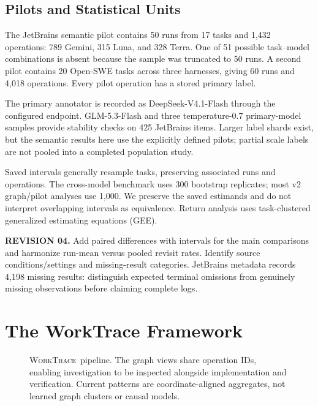 \documentclass[10pt,a4paper,twocolumn]{article}
\newcommand{\rev}[2]{\par\smallskip\noindent\begin{minipage}{\linewidth}\color{revision}\footnotesize\textbf{REVISION #1.} #2\end{minipage}\par\smallskip}
\newcommand{\wt}{\textsc{WorkTrace}}
\begin{document}
\subsection{Pilots and Statistical Units}
The JetBrains semantic pilot contains 50 runs from 17 tasks and 1,432 operations: 789 Gemini, 315 Luna, and 328 Terra. One of 51 possible task--model combinations is absent because the sample was truncated to 50 runs. A second pilot contains 20 Open-SWE tasks across three harnesses, giving 60 runs and 4,018 operations. Every pilot operation has a stored primary label.

The primary annotator is recorded as DeepSeek-V4.1-Flash through the configured endpoint. GLM-5.3-Flash and three temperature-0.7 primary-model samples provide stability checks on 425 JetBrains items. Larger label shards exist, but the semantic results here use the explicitly defined pilots; partial scale labels are not pooled into a completed population study.

Saved intervals generally resample tasks, preserving associated runs and operations. The cross-model benchmark uses 300 bootstrap replicates; most v2 graph/pilot analyses use 1,000. We preserve the saved estimands and do not interpret overlapping intervals as equivalence. Return analysis uses task-clustered generalized estimating equations (GEE).
\rev{04}{Add paired differences with intervals for the main comparisons and harmonize run-mean versus pooled revisit rates. Identify source conditions/settings and missing-result categories. JetBrains metadata records 4,198 missing results: distinguish expected terminal omissions from genuinely missing observations before claiming complete logs.}

\section{The WorkTrace Framework}
\begin{figure}[t]
\centering
{}
\caption{\wt\ pipeline. The graph views share operation IDs, enabling investigation to be inspected alongside implementation and verification. Current patterns are coordinate-aligned aggregates, not learned graph clusters or causal models.}
\label{fig:pipeline}
\end{figure}
\end{document}
